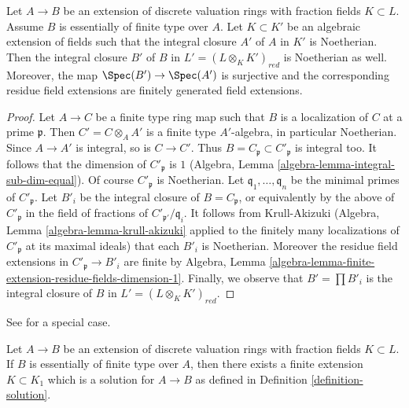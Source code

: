 \begin{lemma}
\label{lemma-big-extension-is-ok}
Let $A \to B$ be an extension of discrete valuation rings with fraction
fields $K \subset L$. Assume $B$ is essentially of finite type over $A$.
Let $K \subset K'$ be an algebraic extension of fields such that
the integral closure $A'$ of $A$ in $K'$ is Noetherian. Then the integral
closure $B'$ of $B$ in $L' = (L \otimes_K K')_{red}$ is Noetherian
as well. Moreover, the map $\Spec(B') \to \Spec(A')$
is surjective and the corresponding residue field extensions are finitely
generated field extensions.
\end{lemma}

\begin{proof}
Let $A \to C$ be a finite type ring map such that $B$ is a localization of
$C$ at a prime $\mathfrak p$. Then $C' = C \otimes_A A'$ is a finite type
$A'$-algebra, in particular Noetherian. Since $A \to A'$ is integral, so
is $C \to C'$. Thus $B = C_\mathfrak p \subset C'_\mathfrak p$ is
integral too. It follows that the dimension of $C'_\mathfrak p$ is $1$
(Algebra, Lemma \ref{algebra-lemma-integral-sub-dim-equal}).
Of course $C'_\mathfrak p$ is Noetherian.
Let $\mathfrak q_1, \ldots, \mathfrak q_n$ be the minimal primes
of $C'_\mathfrak p$. Let $B'_i$ be the integral closure of
$B = C_\mathfrak p$, or equivalently by the above of $C'_\mathfrak p$
in the field of fractions of $C'_{\mathfrak p'}/\mathfrak q_i$.
It follows from Krull-Akizuki
(Algebra, Lemma \ref{algebra-lemma-krull-akizuki} applied
to the finitely many localizations of $C'_\mathfrak p$ at its
maximal ideals) that each $B'_i$ is Noetherian.
Moreover the residue field extensions in $C'_\mathfrak p \to B'_i$
are finite by
Algebra, Lemma \ref{algebra-lemma-finite-extension-residue-fields-dimension-1}.
Finally, we observe that $B' = \prod B'_i$ is the integral closure of $B$ in
$L' = (L \otimes_K K')_{red}$.
\end{proof}

\begin{proposition}
\label{proposition-epp-essentially-finite-type}
\begin{reference}
See \cite[Lemma 2.13]{alterations} for a special case.
\end{reference}
Let $A \to B$ be an extension of discrete valuation rings with fraction
fields $K \subset L$. If $B$ is essentially of finite type over $A$, then
there exists a finite extension $K \subset K_1$ which is a solution for
$A \to B$ as defined in
Definition \ref{definition-solution}.
\end{proposition}

